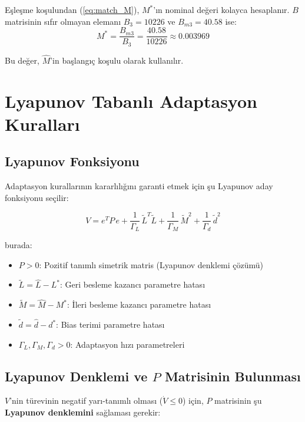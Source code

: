 \documentclass[12pt,a4paper]{article}
\begin{document}
Eşleşme koşulundan (\ref{eq:match_M}), $M^*$'ın nominal değeri kolayca hesaplanır. $B$ matrisinin sıfır olmayan elemanı $B_3 = 10226$ ve $B_{m3} = 40.58$ ise:
\begin{equation}
    M^* = \frac{B_{m3}}{B_3} = \frac{40.58}{10226} \approx 0.003969
\end{equation}

Bu değer, $\hat{M}$'in başlangıç koşulu olarak kullanılır.

\section{Lyapunov Tabanlı Adaptasyon Kuralları}
\label{sec:adaptation}

\subsection{Lyapunov Fonksiyonu}

Adaptasyon kurallarının kararlılığını garanti etmek için şu Lyapunov aday fonksiyonu seçilir:

\begin{equation}
    V = e^T P\,e + \frac{1}{\Gamma_L}\,\tilde{L}^T\tilde{L} + \frac{1}{\Gamma_M}\,\tilde{M}^2 + \frac{1}{\Gamma_d}\,\tilde{d}^2
    \label{eq:lyapunov}
\end{equation}

burada:
\begin{itemize}
    \item $P > 0$: Pozitif tanımlı simetrik matris (Lyapunov denklemi çözümü)
    \item $\tilde{L} = \hat{L} - L^*$: Geri besleme kazancı parametre hatası
    \item $\tilde{M} = \hat{M} - M^*$: İleri besleme kazancı parametre hatası
    \item $\tilde{d} = \hat{d} - d^*$: Bias terimi parametre hatası
    \item $\Gamma_L, \Gamma_M, \Gamma_d > 0$: Adaptasyon hızı parametreleri
\end{itemize}

\subsection{Lyapunov Denklemi ve $P$ Matrisinin Bulunması}
\label{subsec:lyapunov_eq}

$V$'nin türevinin negatif yarı-tanımlı olması ($\dot{V} \leq 0$) için, $P$ matrisinin şu \textbf{Lyapunov denklemini} sağlaması gerekir:
\end{document}
